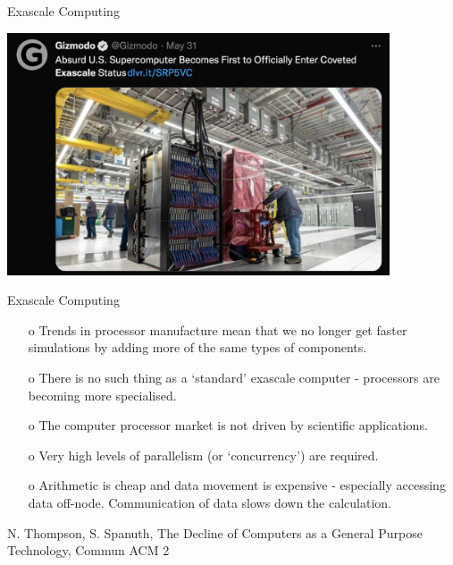 \documentclass{beamer}
\begin{document}
\begin{frame}{Exascale Computing}
  \centerline{\includegraphics[width=0.85\textwidth]{figures/Frontier2}}
\end{frame}

\begin{frame}{Exascale Computing}
  \begin{itemize}
    \item[o] Trends in processor manufacture mean that we no longer
      get faster simulations by adding more of the same types of
      components.
    \item[o] There is no such thing as a `standard' exascale computer
      - processors are becoming more specialised.
    \item[o] The computer processor market is not driven by scientific
      applications.
    \item[o] Very high levels of parallelism (or `concurrency') are required.
    \item[o] Arithmetic is cheap and data movement is expensive -
      especially accessing data off-node. Communication of data slows
      down the calculation.
  \end{itemize}
   N. Thompson, S. Spanuth, The Decline of Computers as a General Purpose Technology, Commun ACM 2
\end{frame}
\end{document}
